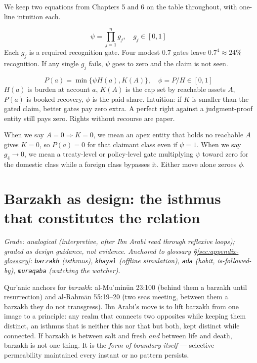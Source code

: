 We keep two equations from Chapters 5 and 6 on the table throughout, with one-line intuition each.

\begin{equation}
\psi = \prod_{j=1}^{n} g_j,\quad g_j \in [0,1] \label{eq:psi-ch7}
\end{equation}
Each $g_j$ is a required recognition gate. Four modest $0.7$ gates leave $0.7^4 \approx 24\%$ recognition. If any single $g_j$ fails, $\psi$ goes to zero and the claim is not seen.

\begin{equation}
P(a) = \min\{\psi H(a), K(A)\},\quad \phi = P/H \in [0,1] \label{eq:PK-ch7}
\end{equation}
$H(a)$ is burden at account $a$, $K(A)$ is the cap set by reachable assets $A$, $P(a)$ is booked recovery, $\phi$ is the paid share. Intuition: if $K$ is smaller than the gated claim, better gates pay zero extra. A perfect right against a judgment-proof entity still pays zero. Rights without recourse are paper.

When we say $A=0 \Rightarrow K=0$, we mean an apex entity that holds no reachable $A$ gives $K=0$, so $P(a)=0$ for that claimant class even if $\psi=1$. When we say $g_4 \to 0$, we mean a treaty-level or policy-level gate multiplying $\psi$ toward zero for the domestic class while a foreign class bypasses it. Either move alone zeroes $\phi$.

\section{Barzakh as design: the isthmus that constitutes the relation}
\label{sec:barzakh-sovereign}

\textit{Grade: analogical (interpretive, after Ibn Arabi read through reflexive loops); graded as design guidance, not evidence. Anchored to glossary \S\ref{sec:appendix-glossary}: \texttt{barzakh} (isthmus), \texttt{khayal} (offline simulation), \texttt{ada} (habit, is-followed-by), \texttt{muraqaba} (watching the watcher).}

Qur'anic anchors for \textit{barzakh}: al-Mu'min\=un 23:100 (behind them a barzakh until resurrection) and al-Rahm\=an 55:19--20 (two seas meeting, between them a barzakh they do not transgress). Ibn Arabi's move is to lift barzakh from one image to a principle: any realm that connects two opposites while keeping them distinct, an isthmus that is neither this nor that but both, kept distinct while connected. If barzakh is between salt and fresh \textit{and} between life and death, barzakh is not one thing. It is the \textit{form of boundary itself} --- selective permeability maintained every instant or no pattern persists.

